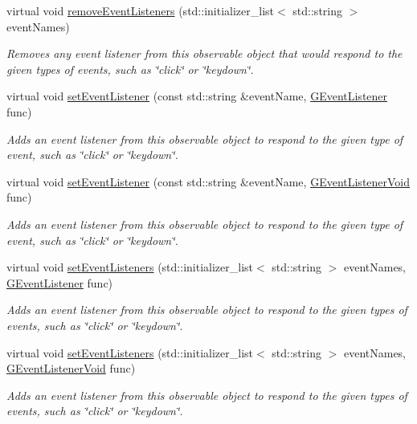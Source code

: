 \begin{DoxyCompactItemize}
virtual void \mbox{\hyperlink{classsgl_1_1GObservable_af51cc35c29a1bd1908609d432decdbb6}{remove\+Event\+Listeners}} (std\+::initializer\+\_\+list$<$ std\+::string $>$ event\+Names)
\begin{DoxyCompactList}\small\item\em Removes any event listener from this observable object that would respond to the given types of events, such as \char`\"{}click\char`\"{} or \char`\"{}keydown\char`\"{}. \end{DoxyCompactList}\item 
virtual void \mbox{\hyperlink{classsgl_1_1GObservable_ad2f6d34961c50f6c1e0659990b79f741}{set\+Event\+Listener}} (const std\+::string \&event\+Name, \mbox{\hyperlink{namespacesgl_ae9f3e9eab70035da1a2b114e21357b25}{G\+Event\+Listener}} func)
\begin{DoxyCompactList}\small\item\em Adds an event listener from this observable object to respond to the given type of event, such as \char`\"{}click\char`\"{} or \char`\"{}keydown\char`\"{}. \end{DoxyCompactList}\item 
virtual void \mbox{\hyperlink{classsgl_1_1GObservable_abac4cb9f9e626e010e87f5d91573c8a5}{set\+Event\+Listener}} (const std\+::string \&event\+Name, \mbox{\hyperlink{namespacesgl_a54427ce97bb1c2804e4fe2b0a62e8b17}{G\+Event\+Listener\+Void}} func)
\begin{DoxyCompactList}\small\item\em Adds an event listener from this observable object to respond to the given type of event, such as \char`\"{}click\char`\"{} or \char`\"{}keydown\char`\"{}. \end{DoxyCompactList}\item 
virtual void \mbox{\hyperlink{classsgl_1_1GObservable_afa388d69c33c718cf035774604065604}{set\+Event\+Listeners}} (std\+::initializer\+\_\+list$<$ std\+::string $>$ event\+Names, \mbox{\hyperlink{namespacesgl_ae9f3e9eab70035da1a2b114e21357b25}{G\+Event\+Listener}} func)
\begin{DoxyCompactList}\small\item\em Adds an event listener from this observable object to respond to the given types of events, such as \char`\"{}click\char`\"{} or \char`\"{}keydown\char`\"{}. \end{DoxyCompactList}\item 
virtual void \mbox{\hyperlink{classsgl_1_1GObservable_a7867184bbb686f74fae8a4db927da799}{set\+Event\+Listeners}} (std\+::initializer\+\_\+list$<$ std\+::string $>$ event\+Names, \mbox{\hyperlink{namespacesgl_a54427ce97bb1c2804e4fe2b0a62e8b17}{G\+Event\+Listener\+Void}} func)
\begin{DoxyCompactList}\small\item\em Adds an event listener from this observable object to respond to the given types of events, such as \char`\"{}click\char`\"{} or \char`\"{}keydown\char`\"{}. \end{DoxyCompactList}\end{DoxyCompactItemize}
